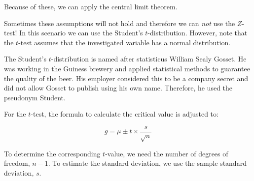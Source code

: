 Because of these, we can apply the central limit theorem.

Sometimes these assumptions will not hold and therefore we can \emph{not} use the $Z$-test! In this scenario we can use the Student's $t$-distribution. However, note that the $t$-test assumes that the investigated variable has a normal distribution.

The Student's $t$-distribution is named after statisticus William Sealy Gosset. He was working in the Guiness brewery and applied statistical methods to guarantee the quality of the beer. His employer considered this to be a company secret and did not allow Gosset to publish using his own name. Therefore, he used the pseudonym Student.

For the $t$-test, the formula to calculate the critical value is adjusted to: 

\begin{equation}
  g = \mu \pm t \times \frac{s}{\sqrt{n}}
  \label{eq:critical-value-t-test}
\end{equation}

To determine the corresponding $t$-value, we need the number of degrees of freedom, $n-1$.
To estimate the standard deviation, we use the sample standard deviation, $s$.

